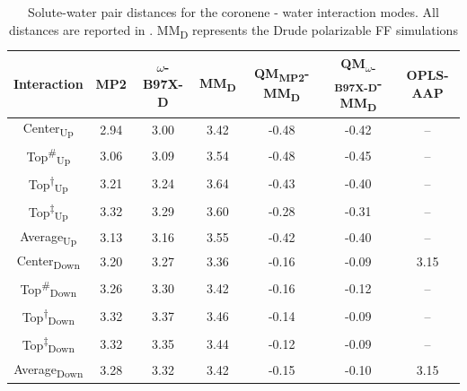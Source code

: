     \begin{table}
        \centering
        \small
        \caption[Solute-water pair distances for the coronene - water interaction modes]{Solute-water pair distances for the coronene - water interaction modes. All distances are reported in \angstrom. MM\textsubscript{D} represents the Drude polarizable FF simulations}
            \begin{tabularx}{\textwidth}{ccccccc}
                \toprule
                Interaction                 &   MP2     &   $\omega$-B97X-D     &   MM\textsubscript{D}     &   QM\textsubscript{MP2}-MM\textsubscript{D}   &   QM\textsubscript{$\omega$-B97X-D}-MM\textsubscript{D}   &   OPLS-AAP \supercite{schyman_exploring_2013}  \\ \midrule
                Center\textsubscript{Up}    &   2.94    &   3.00    &   3.42    &   -0.48   &   -0.42   &   --  \\
                Top\textsuperscript{\#}\textsubscript{Up}   &   3.06    &   3.09    &   3.54    &   -0.48   &   -0.45   &   --  \\
                Top\textsuperscript{$\dagger$}\textsubscript{Up}    &   3.21    &   3.24    &   3.64    &   -0.43   &   -0.40       &   --  \\
                Top\textsuperscript{$\ddagger$}\textsubscript{Up}    &   3.32    &   3.29   &   3.60   &   -0.28  &   -0.31       &   --  \\ 
                Average\textsubscript{Up}   &   3.13    &   3.16    &   3.55    &   -0.42   &   -0.40   &   --  \\
                Center\textsubscript{Down}  &   3.20    &   3.27  &   3.36  &   -0.16 &   -0.09   &   3.15  \\
                Top\textsuperscript{\#}\textsubscript{Down} &   3.26    &   3.30    &   3.42    &   -0.16   &   -0.12   &   --  \\
                Top\textsuperscript{$\dagger$}\textsubscript{Down}  &   3.32    &   3.37    &   3.46    &   -0.14   &   -0.09   &   --  \\
                Top\textsuperscript{$\ddagger$}\textsubscript{Down} &   3.32    &   3.35    &   3.44    &   -0.12   &   -0.09   &   --  \\ 
                Average\textsubscript{Down}   &   3.28    &   3.32  &   3.42  &   -0.15 &   -0.10       &   3.15    \\  \bottomrule        
            \end{tabularx}
        \label{tab:my_label}
    \end{table}

